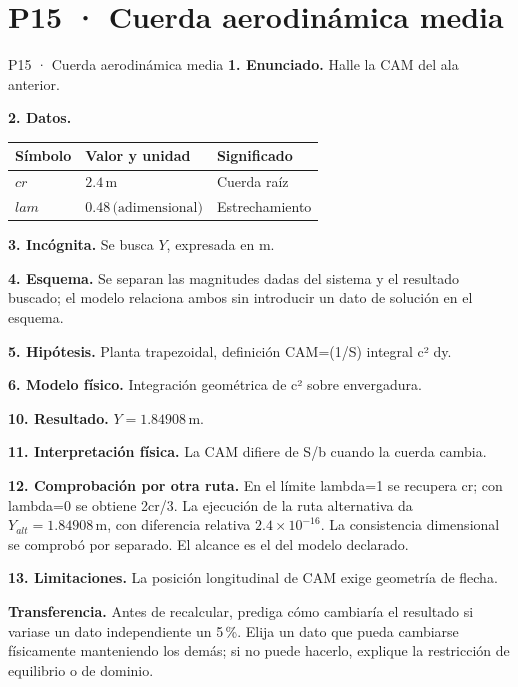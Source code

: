 \chapter*{P15 · Cuerda aerodinámica media}
\begin{studiumworked}{P15 · Cuerda aerodinámica media}
\textbf{1. Enunciado.} Halle la CAM del ala anterior.

\textbf{2. Datos.}
\begin{longtable}{p{.16\linewidth}p{.35\linewidth}p{.38\linewidth}}\toprule Símbolo & Valor y unidad & Significado\\\midrule\endhead
$cr$ & $2.4\,\mathrm m$ & Cuerda raíz\\
$lam$ & $0.48\,\text{(adimensional)}$ & Estrechamiento\\
\bottomrule\end{longtable}
\textbf{3. Incógnita.} Se busca $Y$, expresada en $\mathrm m$.

\textbf{4. Esquema.} Se separan las magnitudes dadas del sistema y el resultado buscado; el modelo relaciona ambos sin introducir un dato de solución en el esquema.

\textbf{5. Hipótesis.} Planta trapezoidal, definición CAM=(1/S) integral c² dy.

\textbf{6. Modelo físico.} Integración geométrica de c² sobre envergadura.


\textbf{10. Resultado.} $Y=1.84908\,\mathrm m$.

\textbf{11. Interpretación física.} La CAM difiere de S/b cuando la cuerda cambia.

\textbf{12. Comprobación por otra ruta.} En el límite lambda=1 se recupera cr; con lambda=0 se obtiene 2cr/3. La ejecución de la ruta alternativa da $Y_{alt}=1.84908\,\mathrm m$, con diferencia relativa $2.4\times10^{-16}$. La consistencia dimensional se comprobó por separado. El alcance es el del modelo declarado.

\textbf{13. Limitaciones.} La posición longitudinal de CAM exige geometría de flecha.

\textbf{Transferencia.} Antes de recalcular, prediga cómo cambiaría el resultado si variase un dato independiente un 5\,\%. Elija un dato que pueda cambiarse físicamente manteniendo los demás; si no puede hacerlo, explique la restricción de equilibrio o de dominio.\par
\end{studiumworked}
